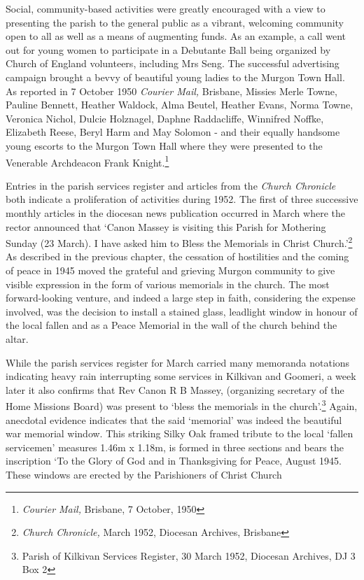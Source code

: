 Social, community-based activities were greatly encouraged with a view
to presenting the parish to the general public as a vibrant, welcoming
community open to all as well as a means of augmenting funds. As an
example, a call went out for young women to participate in a Debutante
Ball being organized by Church of England volunteers, including Mrs
Seng. The successful advertising campaign brought a bevvy of beautiful
young ladies to the Murgon Town Hall. As reported in 7 October 1950
\emph{Courier Mail,} Brisbane, Missies Merle Towne, Pauline Bennett,
Heather Waldock, Alma Beutel, Heather Evans, Norma Towne, Veronica
Nichol, Dulcie Holznagel, Daphne Raddacliffe, Winnifred Noffke,
Elizabeth Reese, Beryl Harm and May Solomon - and their equally handsome
young escorts to the Murgon Town Hall where they were presented to the
Venerable Archdeacon Frank Knight.\footnote{\emph{Courier Mail,}
  Brisbane, 7 October, 1950}

Entries in the parish services register and articles from the
\emph{Church Chronicle} both indicate a proliferation of activities
during 1952. The first of three successive monthly articles in the
diocesan news publication occurred in March where the rector announced
that `Canon Massey is visiting this Parish for Mothering Sunday (23
March). I have asked him to Bless the Memorials in Christ
Church.'\footnote{\emph{Church Chronicle,} March 1952, Diocesan
  Archives, Brisbane} As described in the previous chapter, the
cessation of hostilities and the coming of peace in 1945 moved the
grateful and grieving Murgon community to give visible expression in the
form of various memorials in the church. The most forward-looking
venture, and indeed a large step in faith, considering the expense
involved, was the decision to install a stained glass, leadlight window
in honour of the local fallen and as a Peace Memorial in the wall of the
church behind the altar.

While the parish services register for March carried many memoranda
notations indicating heavy rain interrupting some services in Kilkivan
and Goomeri, a week later it also confirms that Rev Canon R B Massey,
(organizing secretary of the Home Missions Board) was present to `bless
the memorials in the church'.\footnote{Parish of Kilkivan Services
  Register, 30 March 1952, Diocesan Archives, DJ 3 Box 2} Again,
anecdotal evidence indicates that the said `memorial' was indeed the
beautiful war memorial window. This striking Silky Oak framed tribute to
the local `fallen servicemen' measures 1.46m x 1.18m, is formed in three
sections and bears the inscription `To the Glory of God and in
Thanksgiving for Peace, August 1945. These windows are erected by the
Parishioners of Christ Church

